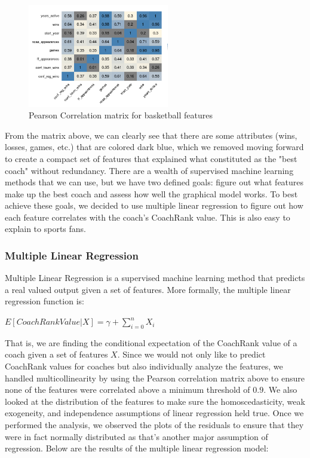 \documentclass[11pt,notitlepage]{article}
\begin{document}
\begin{figure}[H]
      \caption{Pearson Correlation matrix for basketball features}
      \centering
      \includegraphics[width=0.55\textwidth]{bball_cor.png}
\end{figure}

\noindent From the matrix above, we can clearly see that there are some attributes (wins, losses, games, etc.) that are colored dark blue, which we removed moving forward to create a compact set of features that explained what constituted as the "best coach" without redundancy. There are a wealth of supervised machine learning methods that we can use, but we have two defined goals: figure out what features make up the best coach and assess how well the graphical model works. To best achieve these goals, we decided to use multiple linear regression to figure out how each feature correlates with the coach's CoachRank value. This is also easy to explain to sports fans.

\subsubsection*{Multiple Linear Regression}

Multiple Linear Regression is a supervised machine learning method that predicts a real valued output given a set of features. More formally, the multiple linear regression function is:

\begin{center}
$E[CoachRankValue|X] = \gamma + \sum_{i=0}^{n} X_{i}$
\end{center}

\noindent That is, we are finding the conditional expectation of the CoachRank value of a coach given a set of features $X$. Since we would not only like to predict CoachRank values for coaches but also individually analyze the features, we handled multicollinearity by using the Pearson correlation matrix above to ensure none of the features were correlated above a minimum threshold of $0.9$. We also looked at the distribution of the features to make sure the homoscedasticity, weak exogeneity, and independence assumptions of linear regression held true. Once we performed the analysis, we observed the plots of the residuals to ensure that they were in fact normally distributed as that's another major assumption of regression. Below are the results of the multiple linear regression model:
\end{document}
